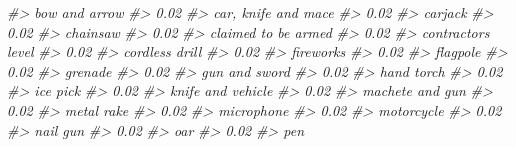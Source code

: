 \documentclass[
  12pt,
  openany]{book}
\newenvironment{Shaded}{\begin{snugshade}}{\end{snugshade}}
\newcommand{\CommentTok}[1]{\textcolor[rgb]{0.37,0.37,0.37}{\textit{#1}}}
\begin{document}
\begin{Shaded}
\begin{Highlighting}[]
\CommentTok{\#\textgreater{}                    bow and arrow }
\CommentTok{\#\textgreater{}                             0.02 }
\CommentTok{\#\textgreater{}              car, knife and mace }
\CommentTok{\#\textgreater{}                             0.02 }
\CommentTok{\#\textgreater{}                          carjack }
\CommentTok{\#\textgreater{}                             0.02 }
\CommentTok{\#\textgreater{}                         chainsaw }
\CommentTok{\#\textgreater{}                             0.02 }
\CommentTok{\#\textgreater{}              claimed to be armed }
\CommentTok{\#\textgreater{}                             0.02 }
\CommentTok{\#\textgreater{}               contractor\textquotesingle{}s level }
\CommentTok{\#\textgreater{}                             0.02 }
\CommentTok{\#\textgreater{}                   cordless drill }
\CommentTok{\#\textgreater{}                             0.02 }
\CommentTok{\#\textgreater{}                        fireworks }
\CommentTok{\#\textgreater{}                             0.02 }
\CommentTok{\#\textgreater{}                         flagpole }
\CommentTok{\#\textgreater{}                             0.02 }
\CommentTok{\#\textgreater{}                          grenade }
\CommentTok{\#\textgreater{}                             0.02 }
\CommentTok{\#\textgreater{}                    gun and sword }
\CommentTok{\#\textgreater{}                             0.02 }
\CommentTok{\#\textgreater{}                       hand torch }
\CommentTok{\#\textgreater{}                             0.02 }
\CommentTok{\#\textgreater{}                         ice pick }
\CommentTok{\#\textgreater{}                             0.02 }
\CommentTok{\#\textgreater{}                knife and vehicle }
\CommentTok{\#\textgreater{}                             0.02 }
\CommentTok{\#\textgreater{}                  machete and gun }
\CommentTok{\#\textgreater{}                             0.02 }
\CommentTok{\#\textgreater{}                       metal rake }
\CommentTok{\#\textgreater{}                             0.02 }
\CommentTok{\#\textgreater{}                       microphone }
\CommentTok{\#\textgreater{}                             0.02 }
\CommentTok{\#\textgreater{}                       motorcycle }
\CommentTok{\#\textgreater{}                             0.02 }
\CommentTok{\#\textgreater{}                         nail gun }
\CommentTok{\#\textgreater{}                             0.02 }
\CommentTok{\#\textgreater{}                              oar }
\CommentTok{\#\textgreater{}                             0.02 }
\CommentTok{\#\textgreater{}                              pen }

\end{Highlighting}
\end{Shaded}
\end{document}
